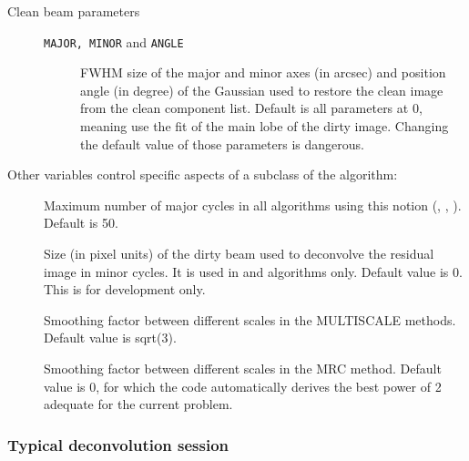 \begin{description}
\item[Clean beam parameters] \mbox{}
  \begin{description}
  \item[\texttt{MAJOR, MINOR} and \texttt{ANGLE}] FWHM size of the major
    and minor axes (in arcsec) and position angle (in degree) of the
    Gaussian used to restore the clean image from the clean component list.
    Default is all parameters at 0, meaning use the fit of the main lobe of
    the dirty image. Changing the default value of those parameters is
    dangerous.
  \end{description}
\end{description}
Other variables control specific aspects of a subclass of the \clean{}
algorithm:
\begin{description}
\item[] Maximum number of major cycles in all algorithms
  using this notion (, , ). Default is 50.
\item[] Size (in pixel units) of the dirty beam used to
  deconvolve the residual image in minor cycles. It is used in  and 
   algorithms only. Default value is 0. This is for development only.
\item[] Smoothing factor between different scales in 
the MULTISCALE methods. Default value is sqrt(3).
\item[] Smoothing factor between different scales in 
the MRC method. Default value is 0, for which the code automatically
derives the best power of 2 adequate for the current problem.
\end{description}

\subsubsection{Typical deconvolution session}

